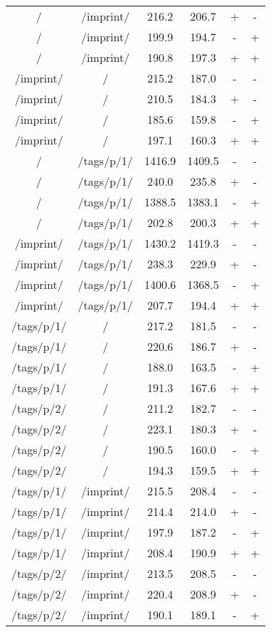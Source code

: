 \begin{appendix}
\begin{center}
\begin{longtable}{cccccc}
/ & /imprint/ & 216.2 & 206.7 & + & - \\
/ & /imprint/ & 199.9 & 194.7 & - & + \\
/ & /imprint/ & 190.8 & 197.3 & + & + \\
\hline
/imprint/ & / & 215.2 & 187.0 & - & - \\
/imprint/ & / & 210.5 & 184.3 & + & - \\
/imprint/ & / & 185.6 & 159.8 & - & + \\
/imprint/ & / & 197.1 & 160.3 & + & + \\
\hline
\hline
/ & /tags/p/1/ & 1416.9 & 1409.5 & - & - \\
/ & /tags/p/1/ & 240.0 & 235.8 & + & - \\
/ & /tags/p/1/ & 1388.5 & 1383.1 & - & + \\
/ & /tags/p/1/ & 202.8 & 200.3 & + & + \\
\hline
/imprint/ & /tags/p/1/ & 1430.2 & 1419.3 & - & - \\
/imprint/ & /tags/p/1/ & 238.3 & 229.9 & + & - \\
/imprint/ & /tags/p/1/ & 1400.6 & 1368.5 & - & + \\
/imprint/ & /tags/p/1/ & 207.7 & 194.4 & + & + \\
\hline
\hline
/tags/p/1/ & / & 217.2 & 181.5 & - & - \\
/tags/p/1/ & / & 220.6 & 186.7 & + & - \\
/tags/p/1/ & / & 188.0 & 163.5 & - & + \\
/tags/p/1/ & / & 191.3 & 167.6 & + & + \\
\hline
/tags/p/2/ & / & 211.2 & 182.7 & - & - \\
/tags/p/2/ & / & 223.1 & 180.3 & + & - \\
/tags/p/2/ & / & 190.5 & 160.0 & - & + \\
/tags/p/2/ & / & 194.3 & 159.5 & + & + \\
\hline
/tags/p/1/ & /imprint/ & 215.5 & 208.4 & - & - \\
/tags/p/1/ & /imprint/ & 214.4 & 214.0 & + & - \\
/tags/p/1/ & /imprint/ & 197.9 & 187.2 & - & + \\
/tags/p/1/ & /imprint/ & 208.4 & 190.9 & + & + \\
\hline
/tags/p/2/ & /imprint/ & 213.5 & 208.5 & - & - \\
/tags/p/2/ & /imprint/ & 220.4 & 208.9 & + & - \\
/tags/p/2/ & /imprint/ & 190.1 & 189.1 & - & + \\

\end{longtable}
\end{center}
\end{appendix}
